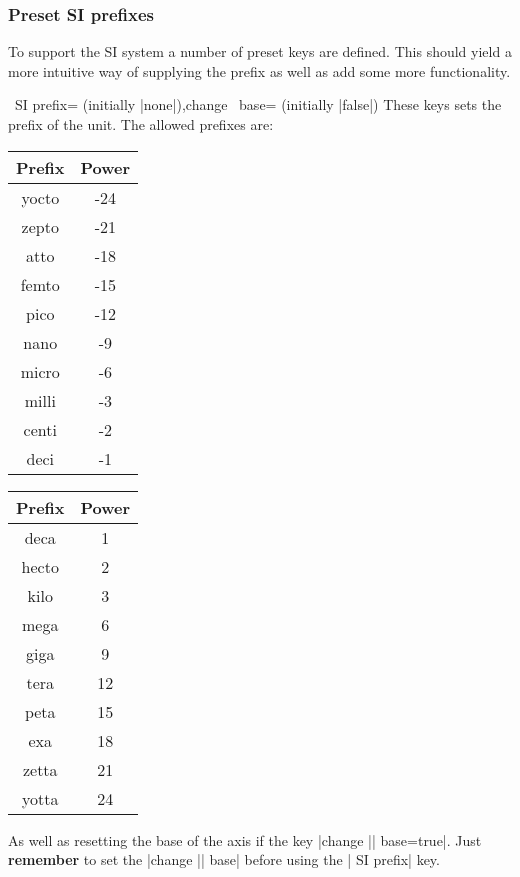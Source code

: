 \subsubsection{Preset SI prefixes}
\label{sec:SI:prefix}
To support the SI system a number of preset keys are defined. This should yield a more intuitive way of supplying the prefix as well as add some more
functionality. 
\begin{pgfplotsxykeylist}{\x\ SI prefix= (initially |none|),change \x\
      base= (initially |false|)}
  These keys sets the prefix of the unit. The allowed prefixes are:

  \begin{center}
    \begin{tabular}{>{\ttfamily}cc}
      \toprule
      \rm Prefix & Power\\
      \midrule
      yocto & -24\\
      zepto & -21\\
      atto & -18\\
      femto & -15\\
      pico & -12\\
      nano& -9\\
      micro & -6\\
      milli & -3\\
      centi& -2\\
      deci& -1\\
\bottomrule
    \end{tabular}\qquad
    \begin{tabular}{>{\ttfamily}cc}
      \toprule
      \rm Prefix & Power\\
      \midrule
      deca & 1\\
      hecto & 2\\
      kilo & 3\\
      mega & 6\\
      giga & 9\\
      tera& 12\\
      peta & 15\\
      exa & 18\\
      zetta& 21\\
      yotta& 24\\
\bottomrule
    \end{tabular}

  \end{center}

  As well as resetting the base of the axis if the key |change || base=true|. Just \textbf{remember} to
  set the |change |\meta{axis}| base| before using the \meta{axis}| SI prefix| key. 


\end{pgfplotsxykeylist}
